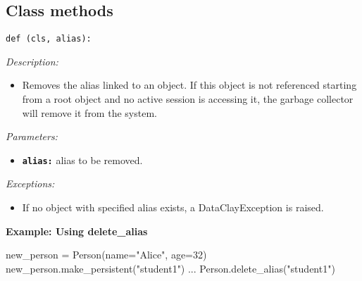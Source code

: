 \subsection{Class methods}
\label{sec:PythonClassMethods}


\begin{dBox}
\texttt{def (cls, alias):}
\LINE

{\it Description:}

\begin{itemize}
    \item Removes the alias linked to an object. If this object is not referenced starting from a root object and no active session is accessing it, the garbage collector will remove it from the system.
\end{itemize}


{\it Parameters:}

\begin{itemize}
    \item \texttt{\bfseries alias:} alias to be removed.
\end{itemize}

{\it Exceptions:}

\begin{itemize}
    \item If no object with specified alias exists, a DataClayException is raised.
\end{itemize}

\end{dBox}

\begin{tBox}
\textcolor{basecolor} {\bf Example: Using delete\_alias}
\begin{python}
new_person = Person(name="Alice", age=32)
new_person.make_persistent("student1")
...
Person.delete_alias("student1")
\end{python}
\end{tBox}



